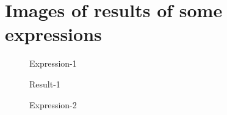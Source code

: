 \documentclass{article}
\begin{document}
\section{Images of results of some expressions}
\begin{figure}[h!]
	\centering
	\caption{Expression-1}
\end{figure}
\begin{figure}[h!]
	\centering
	\caption{Result-1}
\end{figure}
\begin{figure}[h!]
	\centering
	\caption{Expression-2}
\end{figure}
\end{document}
